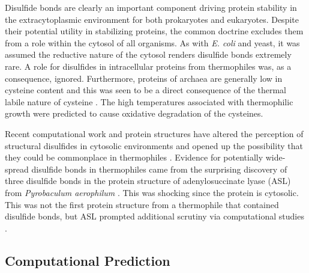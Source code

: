 {%
Disulfide bonds are clearly an important component driving protein stability in
the extracytoplasmic environment for both prokaryotes and eukaryotes.  Despite
their potential utility in stabilizing proteins, the common doctrine excludes
them from a role within the cytosol of all organisms.  As with \emph{E. coli}
and yeast, it was assumed the reductive nature of the cytosol renders disulfide
bonds extremely rare.  A role for disulfides in intracellular proteins
from thermophiles was, as a consequence, ignored.  Furthermore, proteins of
archaea are generally low in cysteine content and this was seen to be a direct
consequence of the thermal labile nature of cysteine \cite{PMID_10097079}. The
high temperatures associated with thermophilic growth were predicted to cause
oxidative degradation of the cysteines.

Recent computational work and protein structures have altered the
perception of structural disulfides in cytosolic environments and opened up
the possibility that they could be commonplace in thermophiles
\cite{beeby2005gdb,mallick2002gei}.  Evidence for potentially wide-spread
disulfide bonds in thermophiles came from the surprising discovery of three
disulfide bonds in the protein structure of adenylosuccinate lyase (ASL) from
\emph{Pyrobaculum aerophilum} \cite{toth2000sal}. This was shocking since the
protein is cytosolic. This was not the first protein structure from a thermophile that
contained disulfide bonds, but ASL prompted additional scrutiny via
computational studies
\cite{jiang1996sai,maes1999cst,dedecker1996csh,chiu2001csn,meyer2002hpt}.  

\subsection{Computational Prediction}

}
